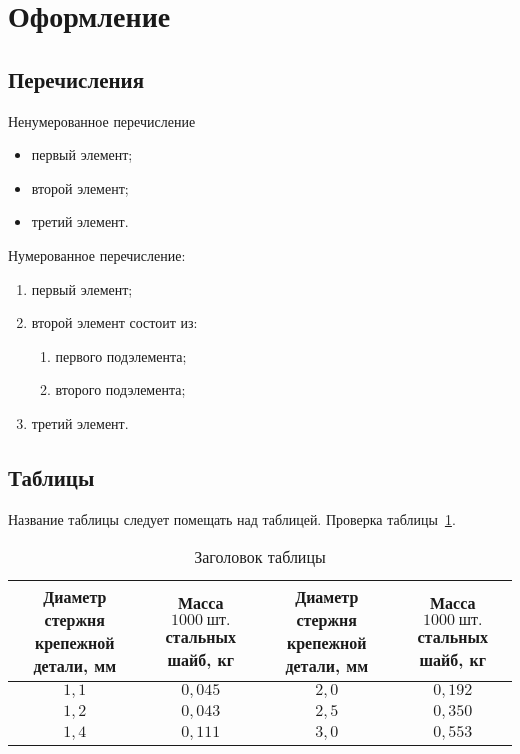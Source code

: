 \section{Оформление}
\subsection{Перечисления}

Ненумерованное перечисление
\begin{itemize}
\item первый элемент;
\item второй элемент;
\item третий элемент.
\end{itemize}

Нумерованное перечисление:
\begin{enumerate}
\item первый элемент;
\item второй элемент состоит из:
\begin{enumerate}
\item первого подэлемента;
\item второго подэлемента;
\end{enumerate}
\item третий элемент.
\end{enumerate}

\subsection{Таблицы}

Название таблицы следует помещать над таблицей. Проверка
таблицы~\ref{t:1}.

\begin{table}[b]
\caption{Заголовок таблицы}
\label{t:1}
\begin{tabular}{|c|c|c|c|}
\hline
\multicolumn{1}{|p{4cm}|}{Диаметр стержня крепежной детали, мм}&
\multicolumn{1}{p{4cm}|}{Масса $1000~\text{шт.}$ стальных шайб, кг}&
\multicolumn{1}{p{4cm}|}{Диаметр стержня крепежной детали, мм}&
\multicolumn{1}{p{4cm}|}{Масса $1000~\text{шт.}$ стальных шайб,
кг}\\\hline
$1{,}1$ & $0{,}045$ & $2{,}0$ & $0{,}192$\\\hline
$1{,}2$ & $0{,}043$ & $2{,}5$ & $0{,}350$\\\hline
$1{,}4$ & $0{,}111$ & $3{,}0$ & $0{,}553$\\\hline
\end{tabular}
\end{table}

